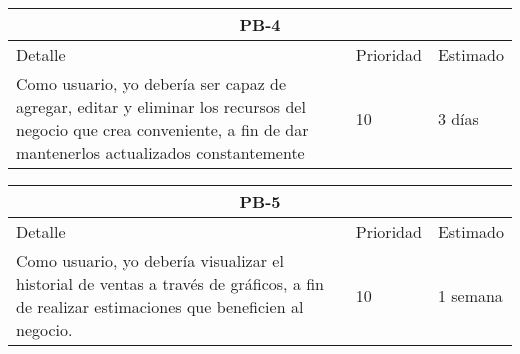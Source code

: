 \begin{table}[htbp]
	\begin{center}
		\begin{tabular}{|p{10cm} | p{2cm} | p{2cm}|}
			\hline
			\multicolumn{3}{|c|}{PB-4}\\
			\hline
			Detalle & Prioridad & Estimado \\
			\hline
			Como usuario, yo debería ser capaz de agregar, editar y eliminar los recursos del negocio que crea conveniente, a fin de dar mantenerlos actualizados constantemente& 10 & 3 días \\
			\hline	
		\end{tabular}
	\end{center}
\end{table}

\begin{table}[htbp]
	\begin{center}
		\begin{tabular}{|p{10cm} | p{2cm} | p{2cm}|}
			\hline
			\multicolumn{3}{|c|}{PB-5}\\
			\hline
			Detalle & Prioridad & Estimado \\
			\hline
			Como usuario, yo debería visualizar el historial de ventas a través de gráficos, a fin de realizar estimaciones que beneficien al negocio. & 10 & 1 semana \\
			\hline	
		\end{tabular}
	\end{center}
\end{table}

